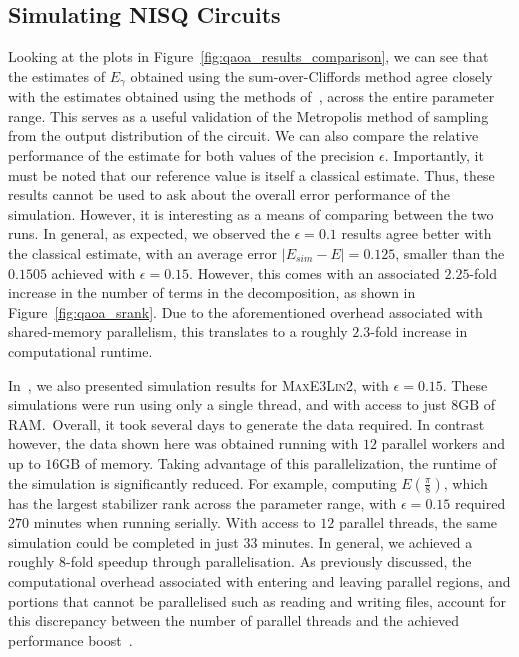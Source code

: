 \subsection{Simulating NISQ Circuits}
Looking at the plots in Figure~\ref{fig:qaoa_results_comparison}, we can see that the estimates of $E_{\gamma}$ obtained using the sum-over-Cliffords method agree closely with the estimates obtained using the methods of~\cite{VandenNest2009}, across the entire parameter range. This serves as a useful validation of the Metropolis method of sampling from the output distribution of the circuit. We can also compare the relative performance of the estimate for both values of the precision $\epsilon$. Importantly, it must be noted that our reference value is itself a classical estimate. Thus, these results cannot be used to ask about the overall error performance of the simulation. However, it is interesting as a means of comparing between the two runs. In general, as expected, we observed the $\epsilon=0.1$ results agree better with the classical estimate, with an average error $\left|E_{sim}-E\right|=0.125$, smaller than the $0.1505$ achieved with $\epsilon=0.15$. However, this comes with an associated $2.25$-fold increase in the number of terms in the decomposition, as shown in Figure~\ref{fig:qaoa_srank}. Due to the aforementioned overhead associated with shared-memory parallelism, this translates to a roughly $2.3$-fold increase in computational runtime.\par
In~\cite{Bravyi2018}, we also presented simulation results for \textsc{MaxE3Lin2}, with $\epsilon=0.15$. These simulations were run using only a single thread, and with access to just $8\mathrm{GB}$ of RAM.\ Overall, it took several days to generate the data required. In contrast however, the data shown here was obtained running with $12$ parallel workers and up to $16\mathrm{GB}$ of memory. Taking advantage of this parallelization, the runtime of the simulation is significantly reduced. For example, computing $E(\frac{\pi}{8})$, which has the largest stabilizer rank across the parameter range, with $\epsilon=0.15$ required $270$ minutes when running serially. With access to $12$ parallel threads, the same simulation could be completed in just $33$ minutes. In general, we achieved a roughly $8$-fold speedup through parallelisation. As previously discussed, the computational overhead associated with entering and leaving parallel regions, and portions that cannot be parallelised such as reading and writing files, account for this discrepancy between the number of parallel threads and the achieved performance boost~\cite{Amdahl1967}.\par
